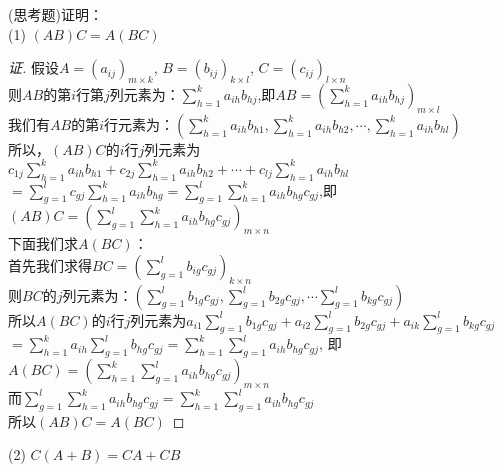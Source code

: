 \documentclass[10pt,a4paper]{report}
\begin{document}
\noindent (思考题)证明：\\
\noindent (1) $(AB)C = A(BC)$
\begin{proof}[证]
	假设$A = (a_{ij})_{m \times k}$, $B = (b_{ij})_{k \times l}$, $C = (c_{ij})_{l \times n}$\\
	则$AB$的第$i$行第$j$列元素为：$\sum\limits_{h=1}^{k}a_{ih}b_{hj}$,即$AB=(\sum\limits_{h=1}^{k}a_{ih}b_{hj})_{m \times l}$\\
	我们有$AB$的第$i$行元素为：$(\sum\limits_{h=1}^{k}a_{ih}b_{h1}, \sum\limits_{h=1}^{k}a_{ih}b_{h2}, \cdots ,\sum\limits_{h=1}^{k}a_{ih}b_{hl})$\\
	所以，$(AB)C$的$i$行$j$列元素为$c_{1j}\sum\limits_{h=1}^{k}a_{ih}b_{h1} + c_{2j}\sum\limits_{h=1}^{k}a_{ih}b_{h2} + \cdots + c_{lj}\sum\limits_{h=1}^{k}a_{ih}b_{hl}$\\
	$= \sum\limits_{g=1}^{l}c_{gj}\sum\limits_{h=1}^{k}a_{ih}b_{hg} = \sum\limits_{g=1}^{l}\sum\limits_{h=1}^{k}a_{ih}b_{hg}c_{gj}$,即$(AB)C = (\sum\limits_{g=1}^{l}\sum\limits_{h=1}^{k}a_{ih}b_{hg}c_{gj})_{m \times n}$\\
	下面我们求$A(BC)$：\\
	首先我们求得$BC = (\sum\limits_{g=1}^{l}b_{ig}c_{gj})_{k \times n}$\\
	则$BC$的$j$列元素为：$(\sum\limits_{g=1}^{l}b_{1g}c_{gj}, \sum\limits_{g=1}^{l}b_{2g}c_{gj}, \cdots \sum\limits_{g=1}^{l}b_{kg}c_{gj})$\\
	所以$A(BC)$的$i$行$j$列元素为$a_{i1}\sum\limits_{g=1}^{l}b_{1g}c_{gj}+a_{i2}\sum\limits_{g=1}^{l}b_{2g}c_{gj}+a_{ik}\sum\limits_{g=1}^{l}b_{kg}c_{gj}$\\
	$= \sum\limits_{h=1}^{k}a_{ih}\sum\limits_{g=1}^{l}b_{hg}c_{gj} =  \sum\limits_{h=1}^{k}\sum\limits_{g=1}^{l}a_{ih}b_{hg}c_{gj}$, 即$A(BC) = (\sum\limits_{h=1}^{k}\sum\limits_{g=1}^{l}a_{ih}b_{hg}c_{gj})_{m \times n}$\\
	而$\sum\limits_{g=1}^{l}\sum\limits_{h=1}^{k}a_{ih}b_{hg}c_{gj} = \sum\limits_{h=1}^{k}\sum\limits_{g=1}^{l}a_{ih}b_{hg}c_{gj}$\\
	所以$(AB)C = A(BC)$
\end{proof}
\noindent (2) $C(A+B) = CA+CB$
\end{document}

